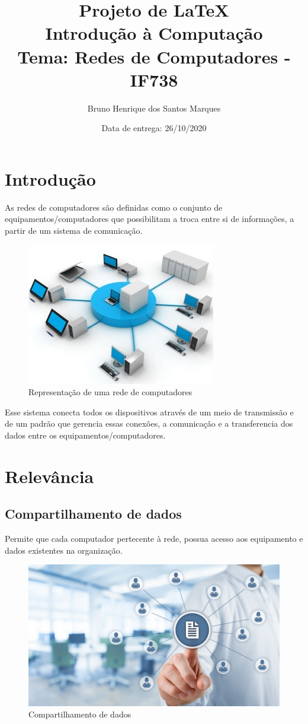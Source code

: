 \documentclass[12pt]{article}%
\title{
Projeto de \LaTeX\\%
Introdução à Computação\\
\Large Tema: Redes de Computadores - IF738\\%
}
\author{Bruno Henrique dos Santos Marques}
\date{Data de entrega: 26/10/2020}
\begin{document}
\onehalfspacing %

\maketitle

\section{Introdu\c c\~ao}
\par As redes de computadores são definidas como o conjunto de equipamentos/computadores que possibilitam a troca entre si de informações, a partir de um sistema de comunicação.\citep{site}
\begin{figure}[h]
    \centering
    \includegraphics{introducao.jpg}
    \caption{Representação de uma rede de computadores\citep{introducao}}
\end{figure}
\par Esse sistema conecta todos os dispositivos através de um meio de transmissão e de um padrão que gerencia essas conexões, a comunicação e a transferencia dos dados entre os equipamentos/computadores.\citep{youtube}

\section{Relev\^ancia}

\subsection{Compartilhamento de dados}
\par Permite que cada computador pertecente à rede, possua acesso aos equipamento e dados existentes na organização.\citep{youtube}
\begin{figure}[h]
    \centering
    \includegraphics[scale = 0.2]{datashare.jpg}
    \caption{Compartilhamento de dados\citep{datashare}}
\end{figure}
\end{document}
